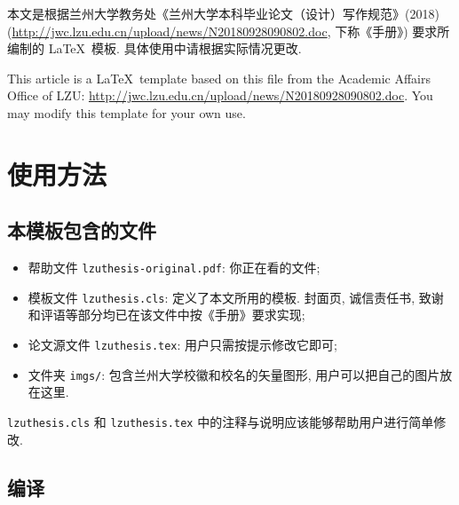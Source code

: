 \documentclass{lzuthesis}
\begin{document}
\makecover

\makeliability

\begin{cnabstract}
	本文是根据兰州大学教务处《兰州大学本科毕业论文（设计）写作规范》(2018)
	(\url{http://jwc.lzu.edu.cn/upload/news/N20180928090802.doc},
	下称《手册》) 要求所编制的 \LaTeX\ 模板. 具体使用中请根据实际情况更改.
\end{cnabstract}

\begin{enabstract}
	This article is a \LaTeX\ template based on this file from the Academic Affairs Office of LZU: \url{http://jwc.lzu.edu.cn/upload/news/N20180928090802.doc}. You may modify this template for your own use.
\end{enabstract}

\maketoc


\section{使用方法}

\subsection{本模板包含的文件}

\begin{itemize}
	\item 帮助文件 \texttt{lzuthesis-original.pdf}: 你正在看的文件;
	\item 模板文件 \texttt{lzuthesis.cls}: 定义了本文所用的模板.
	封面页, 诚信责任书, 致谢和评语等部分均已在该文件中按《手册》要求实现;
	\item 论文源文件 \texttt{lzuthesis.tex}: 用户只需按提示修改它即可;
	\item 文件夹 \texttt{imgs/}: 包含兰州大学校徽和校名的矢量图形,
		用户可以把自己的图片放在这里.
\end{itemize}
\texttt{lzuthesis.cls} 和 \texttt{lzuthesis.tex}
中的注释与说明应该能够帮助用户进行简单修改.

\subsection{编译}
\end{document}
